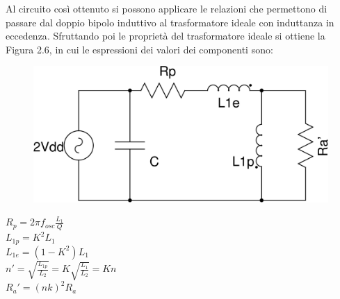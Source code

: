 \documentclass[a4paper, 12pt]{memoir}
\begin{document}
Al circuito così ottenuto si possono applicare le relazioni che permettono di
passare dal doppio bipolo induttivo al trasformatore ideale con induttanza in
eccedenza\cite[pp. 322-323]{GuarnieriET}. Sfruttando poi le proprietà del
trasformatore ideale si ottiene la Figura 2.6, in cui le espressioni dei valori
dei componenti sono:
\noindent\begin{minipage}{0.5\textwidth}
\begin{figure}[H]
\includegraphics[width=\textwidth]{images/cir_model1.pdf}
\caption{}
\end{figure}
\end{minipage}
\hspace{0.1\textwidth}
\noindent\begin{minipage}{0.4\textwidth}
\noindent$ R_p = 2 \pi f_{osc} \frac{L_1}{Q} $ \\
$ L_{1p} = K^2 L_1 $ \\
$ L_{1e} = \left( 1 - K^2 \right) L_1 $ \\
$ n' = \sqrt{\frac{L_{1p}}{L_2}} = K \sqrt{\frac{L_1}{L_2}} = Kn $\\
$ R_a' = {\left( nk \right)}^2 R_a $
\end{minipage}
\end{document}
